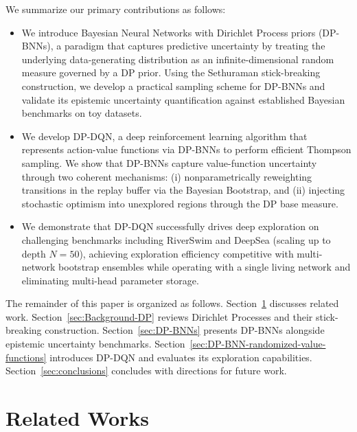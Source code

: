\documentclass[10pt]{article}
\begin{document}
We summarize our primary contributions as follows:
\begin{itemize}
    \item We introduce Bayesian Neural Networks with Dirichlet Process priors (DP-BNNs), a paradigm that captures predictive uncertainty by treating the underlying data-generating distribution as an infinite-dimensional random measure governed by a DP prior. Using the Sethuraman stick-breaking construction, we develop a practical sampling scheme for DP-BNNs and validate its epistemic uncertainty quantification against established Bayesian benchmarks on toy datasets.
    
    \item We develop DP-DQN, a deep reinforcement learning algorithm that represents action-value functions via DP-BNNs to perform efficient Thompson sampling. We show that DP-BNNs capture value-function uncertainty through two coherent mechanisms: (i) nonparametrically reweighting transitions in the replay buffer via the Bayesian Bootstrap, and (ii) injecting stochastic optimism into unexplored regions through the DP base measure.
    
    \item We demonstrate that DP-DQN successfully drives deep exploration on challenging benchmarks including RiverSwim and DeepSea (scaling up to depth $N=50$), achieving exploration efficiency competitive with multi-network bootstrap ensembles while operating with a single living network and eliminating multi-head parameter storage.
\end{itemize}

The remainder of this paper is organized as follows. Section~\ref{sec:related-works} discusses related work. Section~\ref{sec:Background-DP} reviews Dirichlet Processes and their stick-breaking construction. Section~\ref{sec:DP-BNNs} presents DP-BNNs alongside epistemic uncertainty benchmarks. Section~\ref{sec:DP-BNN-randomized-value-functions} introduces DP-DQN and evaluates its exploration capabilities. Section~\ref{sec:conclusions} concludes with directions for future work.


\section{Related Works}
\label{sec:related-works}
\end{document}
